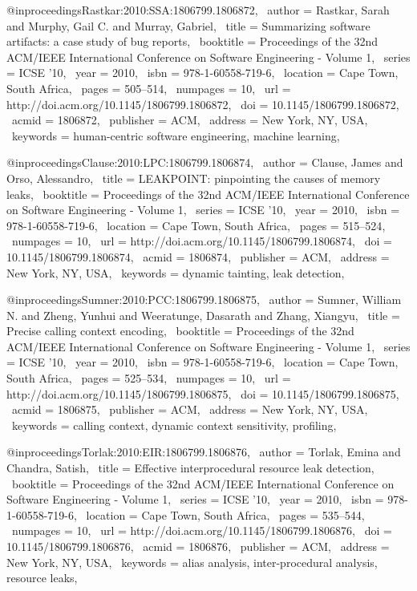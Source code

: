 @inproceedings{Rastkar:2010:SSA:1806799.1806872,
 author = {Rastkar, Sarah and Murphy, Gail C. and Murray, Gabriel},
 title = {Summarizing software artifacts: a case study of bug reports},
 booktitle = {Proceedings of the 32nd ACM/IEEE International Conference on Software Engineering - Volume 1},
 series = {ICSE '10},
 year = {2010},
 isbn = {978-1-60558-719-6},
 location = {Cape Town, South Africa},
 pages = {505--514},
 numpages = {10},
 url = {http://doi.acm.org/10.1145/1806799.1806872},
 doi = {10.1145/1806799.1806872},
 acmid = {1806872},
 publisher = {ACM},
 address = {New York, NY, USA},
 keywords = {human-centric software engineering, machine learning},
} 

@inproceedings{Clause:2010:LPC:1806799.1806874,
 author = {Clause, James and Orso, Alessandro},
 title = {LEAKPOINT: pinpointing the causes of memory leaks},
 booktitle = {Proceedings of the 32nd ACM/IEEE International Conference on Software Engineering - Volume 1},
 series = {ICSE '10},
 year = {2010},
 isbn = {978-1-60558-719-6},
 location = {Cape Town, South Africa},
 pages = {515--524},
 numpages = {10},
 url = {http://doi.acm.org/10.1145/1806799.1806874},
 doi = {10.1145/1806799.1806874},
 acmid = {1806874},
 publisher = {ACM},
 address = {New York, NY, USA},
 keywords = {dynamic tainting, leak detection},
} 

@inproceedings{Sumner:2010:PCC:1806799.1806875,
 author = {Sumner, William N. and Zheng, Yunhui and Weeratunge, Dasarath and Zhang, Xiangyu},
 title = {Precise calling context encoding},
 booktitle = {Proceedings of the 32nd ACM/IEEE International Conference on Software Engineering - Volume 1},
 series = {ICSE '10},
 year = {2010},
 isbn = {978-1-60558-719-6},
 location = {Cape Town, South Africa},
 pages = {525--534},
 numpages = {10},
 url = {http://doi.acm.org/10.1145/1806799.1806875},
 doi = {10.1145/1806799.1806875},
 acmid = {1806875},
 publisher = {ACM},
 address = {New York, NY, USA},
 keywords = {calling context, dynamic context sensitivity, profiling},
} 

@inproceedings{Torlak:2010:EIR:1806799.1806876,
 author = {Torlak, Emina and Chandra, Satish},
 title = {Effective interprocedural resource leak detection},
 booktitle = {Proceedings of the 32nd ACM/IEEE International Conference on Software Engineering - Volume 1},
 series = {ICSE '10},
 year = {2010},
 isbn = {978-1-60558-719-6},
 location = {Cape Town, South Africa},
 pages = {535--544},
 numpages = {10},
 url = {http://doi.acm.org/10.1145/1806799.1806876},
 doi = {10.1145/1806799.1806876},
 acmid = {1806876},
 publisher = {ACM},
 address = {New York, NY, USA},
 keywords = {alias analysis, inter-procedural analysis, resource leaks},
} 

